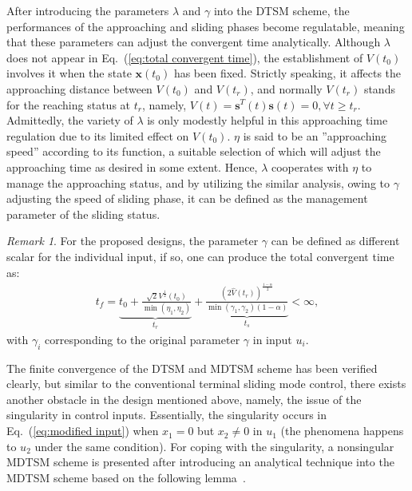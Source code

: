 \documentclass[3p]{elsarticle}
\theoremstyle{plain}
\theoremstyle{remark}
\newtheorem{myrem}{Remark}
\begin{document}
After introducing the parameters $\lambda$ and $\gamma$ into the DTSM scheme, the performances of the approaching and sliding phases become regulatable, meaning that these parameters can adjust the convergent time analytically. Although $\lambda$ does not appear in Eq.~(\ref{eq:total convergent time}), the establishment of $V(t_0)$ involves it when the state $\bm x(t_0)$ has been fixed. Strictly speaking, it affects the approaching distance between $V(t_0)$ and $V(t_r)$, and normally $V(t_r)$ stands for the reaching status at $t_r$, namely, $V(t)=\bm s^T(t)\bm s(t) = 0,\forall t\ge t_r$. Admittedly, the variety of $\lambda$ is only modestly helpful in this approaching time regulation due to its limited effect on $V(t_0)$. $\eta$ is said to be an ''approaching speed'' according to its function, a suitable selection of which will adjust the approaching time as desired in some extent. Hence, $\lambda$ cooperates with $\eta$ to manage the approaching status, and by utilizing the similar analysis, owing to $\gamma$ adjusting the speed of sliding phase, it can be defined as the management parameter of the sliding status.
\begin{myrem}
For the proposed designs, the parameter $\gamma$ can be defined as different scalar for the individual input, if so, one can produce the total convergent time as:
\begin{align}
t_f = \underbrace{t_0+\frac{\sqrt{2}V^{\frac{1}{2}}(t_0)}{\min(\eta_1,\eta_2)}}_{t_r}+\underbrace{\frac{(2\hat V(t_r))^{\frac{1-\alpha}{2}}}{\min(\gamma_1,\gamma_2)(1-\alpha)}}_{t_s}<\infty,\label{eq:normal total convergent time}
\end{align}
with $\gamma_i$ corresponding to the original parameter $\gamma$ in input $u_i$.
\end{myrem}
The finite convergence of the DTSM and MDTSM scheme has been verified clearly, but similar to the conventional terminal sliding mode control, there exists another obstacle in the design mentioned above, namely, the issue of the singularity in control inputs. Essentially, the singularity occurs in Eq.~(\ref{eq:modified input}) when $x_1=0$ but $x_2\neq 0$ in $u_1$ (the phenomena happens to $u_2$ under the same condition). For coping with the singularity, a nonsingular MDTSM scheme is presented after introducing an analytical technique into the MDTSM scheme based on the following lemma~\cite{feng2013nonsingular}.
\end{document}
